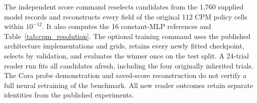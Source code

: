The independent score command reselects candidates from the 1,760 supplied model records and reconstructs every field of the original 112 CPM policy cells within $10^{-12}$. It also computes the 16 constant-MLP references and Table~\ref{tab:cpm_resolution}. The optional training command uses the published architecture implementations and grids, retains every newly fitted checkpoint, selects by validation, and evaluates the winner once on the test split. A 24-trial reader run fits all candidates afresh, including the four originally inherited trials. The Cora probe demonstration and saved-score reconstruction do not certify a full neural retraining of the benchmark. All new reader outcomes retain separate identities from the published experiments.
